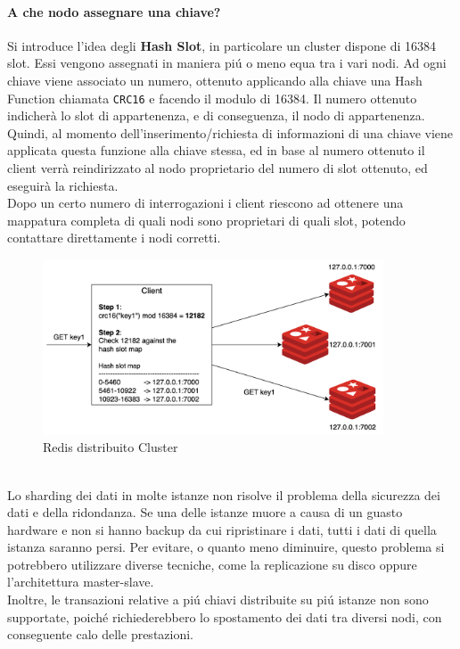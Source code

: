 \paragraph{A che nodo assegnare una chiave?\\}
Si introduce l'idea degli \textbf{Hash Slot}, in particolare un cluster dispone di 16384 slot.
Essi vengono assegnati in maniera piú o meno equa tra i vari nodi.
Ad ogni chiave viene associato un numero, ottenuto applicando alla chiave una Hash Function chiamata \texttt{CRC16}
e facendo il modulo di 16384.
Il numero ottenuto indicherà lo slot di appartenenza, e di conseguenza, il nodo di appartenenza.
Quindi, al momento dell'inserimento/richiesta di informazioni di una chiave viene applicata questa funzione alla chiave stessa,
ed in base al numero ottenuto il client verrà reindirizzato al nodo proprietario del numero di slot ottenuto, ed eseguirà la richiesta.\\
Dopo un certo numero di interrogazioni i client riescono ad ottenere una mappatura completa di quali nodi sono proprietari di quali slot,
potendo contattare direttamente i nodi corretti.
\begin{figure}[H]
    \begin{center}
        \includegraphics[width=0.9\textwidth]{img/hashslotCluster}
    \end{center}
\caption{Redis distribuito Cluster}
\end{figure}
\\
Lo sharding dei dati in molte istanze non risolve il problema della sicurezza dei dati e della ridondanza. Se una delle istanze muore
a causa di un guasto hardware e non si hanno backup da cui ripristinare i dati, tutti i dati di quella istanza saranno persi.
Per evitare, o quanto meno diminuire, questo problema si potrebbero utilizzare diverse tecniche, come la replicazione su disco oppure l'architettura master-slave.\\
Inoltre, le transazioni relative a piú chiavi distribuite su piú istanze non sono supportate, poiché richiederebbero lo spostamento
dei dati tra diversi nodi, con conseguente calo delle prestazioni.\\
\\



